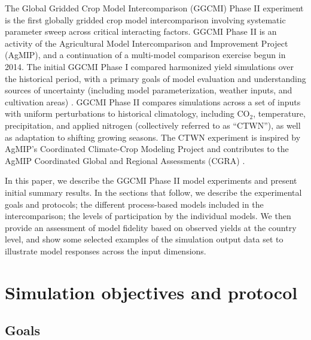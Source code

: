 \documentclass[gmd, manuscript]{copernicus} %
\begin{document}
The Global Gridded Crop Model Intercomparison (GGCMI) Phase II experiment is the first globally gridded crop model intercomparison involving systematic parameter sweep across critical interacting factors.
GGCMI Phase II is an activity of the Agricultural Model Intercomparison and Improvement Project (AgMIP), 
and a continuation of a multi-model comparison exercise begun in 2014. 
The initial GGCMI Phase I compared harmonized yield simulations over the historical period, with a primary goals of model evaluation and understanding sources of uncertainty (including model parameterization, weather inputs, and cultivation areas) \citep{Elliott2015, muller_global_2017, folberth2016, porwollik_spatial_2016}. 
GGCMI Phase II compares simulations across a set of inputs with uniform perturbations to historical climatology,  
including CO$_2$, temperature, precipitation, and applied nitrogen (collectively referred to as ``CTWN''), as well as adaptation to shifting growing seasons. 
The CTWN experiment is inspired by AgMIP's Coordinated Climate-Crop Modeling Project \citep[C3MP][]{ruane2014,mcdermid2015agmip} and contributes to the AgMIP Coordinated Global and Regional Assessments (CGRA) \citep{ruane2018, rosenzweig2018}. 

In this paper, we describe the GGCMI Phase II model experiments and present initial summary results.
In the sections that follow, we describe the experimental goals and protocols; the different process-based models included in the intercomparison; the levels of participation by the individual models. We then provide an assessment of model fidelity based on observed yields at the country level, and show some selected examples of the simulation output data set to illustrate model responses across the input dimensions.

\section{Simulation objectives and protocol}
\label{S:2}
\subsection{Goals}
\end{document}
